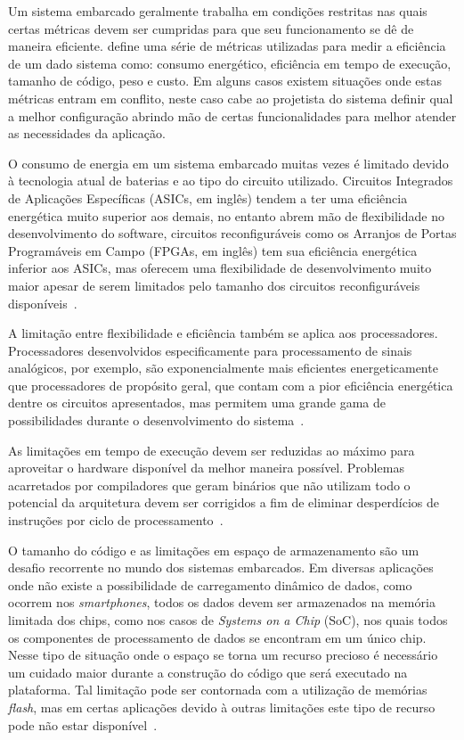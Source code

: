 Um sistema embarcado geralmente trabalha em condições restritas nas quais certas métricas devem ser cumpridas para que seu funcionamento se dê de maneira eficiente.  define uma série de métricas utilizadas para medir a eficiência de um dado sistema como: consumo energético, eficiência em tempo de execução, tamanho de código, peso e custo. Em alguns casos existem situações onde estas métricas entram em conflito, neste caso cabe ao projetista do sistema definir qual a melhor configuração abrindo mão de certas funcionalidades para melhor atender as necessidades da aplicação.

O consumo de energia em um sistema embarcado muitas vezes é limitado devido à tecnologia atual de baterias e ao tipo do circuito utilizado. Circuitos Integrados de Aplicações Específicas (ASICs, em inglês) tendem a ter uma eficiência energética muito superior aos demais, no entanto abrem mão de flexibilidade no desenvolvimento do software, circuitos reconfiguráveis como os Arranjos de Portas Programáveis em Campo (FPGAs, em inglês) tem sua eficiência energética inferior aos ASICs, mas oferecem uma flexibilidade de desenvolvimento muito maior apesar de serem limitados pelo tamanho dos circuitos reconfiguráveis disponíveis~\cite{marwedel:2011}.

A limitação entre flexibilidade e eficiência também se aplica aos processadores. Processadores desenvolvidos especificamente para processamento de sinais analógicos, por exemplo, são exponencialmente mais eficientes energeticamente que processadores de propósito geral, que contam com a pior eficiência energética dentre os circuitos apresentados, mas permitem uma grande gama de possibilidades durante o desenvolvimento do sistema~\cite{marwedel:2011}.

As limitações em tempo de execução devem ser reduzidas ao máximo para aproveitar o hardware disponível da melhor maneira possível. Problemas acarretados por compiladores que geram binários que não utilizam todo o potencial da arquitetura devem ser corrigidos a fim de eliminar desperdícios de instruções por ciclo de processamento~\cite{marwedel:2011}.

O tamanho do código e as limitações em espaço de armazenamento são um desafio recorrente no mundo dos sistemas embarcados. Em diversas aplicações onde não existe a possibilidade de carregamento dinâmico de dados, como ocorrem nos \textit{smartphones}, todos os dados devem ser armazenados na memória limitada dos chips, como nos casos de \textit{Systems on a Chip} (SoC), nos quais todos os componentes de processamento de dados se encontram em um único chip. Nesse tipo de situação onde o espaço se torna um recurso precioso é necessário um cuidado maior durante a construção do código que será executado na plataforma. Tal limitação pode ser contornada com a utilização de memórias \textit{flash}, mas em certas aplicações devido à outras limitações este tipo de recurso pode não estar disponível~\cite{marwedel:2011}.

